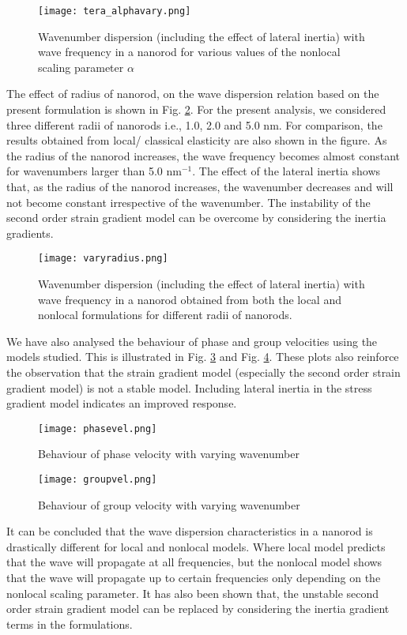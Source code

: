 \begin{figure}
\centering
\texttt{[image: tera\_alphavary.png]}
\caption{Wavenumber dispersion (including the effect of lateral inertia) with wave
frequency in a nanorod for various values of the nonlocal scaling parameter $\alpha$}
\label{varyalpha}
\end{figure}

The effect of radius of nanorod, on the wave dispersion relation
based on the present formulation is shown in Fig. \ref{varyradius}. For the present
analysis, we considered three different radii of nanorods i.e., 1.0,
2.0 and 5.0 nm. For comparison, the results obtained from local/
classical elasticity are also shown in the figure. As the radius of the
nanorod increases, the wave frequency becomes almost constant for
wavenumbers larger than 5.0 $\text{nm}^{-1}$. The effect of the lateral inertia
shows that, as the radius of the nanorod increases, the wavenumber
decreases and will not become constant irrespective of the wavenumber. The instability of the second order strain gradient
model can be overcome by considering the inertia gradients.

\begin{figure}
\centering
\texttt{[image: varyradius.png]}
\caption{Wavenumber dispersion (including the effect of lateral inertia) with wave
frequency in a nanorod obtained from both the local and nonlocal formulations for
different radii of nanorods.}
\label{varyradius}
\end{figure}

We have also analysed the behaviour of phase and group velocities using the models studied. This is illustrated in Fig. \ref{phasevel} and Fig. \ref{groupvel}. These plots also reinforce the observation that the strain gradient model (especially the second order strain gradient model) is not a stable model. Including lateral inertia in the stress gradient model indicates an improved response.

\begin{figure}
\centering
\texttt{[image: phasevel.png]}
\caption{Behaviour of phase velocity with varying wavenumber}
\label{phasevel}
\end{figure}

\begin{figure}
\centering
\texttt{[image: groupvel.png]}
\caption{Behaviour of group velocity with varying wavenumber}
\label{groupvel}
\end{figure}

It can be concluded that the wave dispersion characteristics in a
nanorod is drastically different for local and nonlocal models.
Where local model predicts that the wave will propagate at all
frequencies, but the nonlocal model shows that the wave will
propagate up to certain frequencies only depending on the nonlocal
scaling parameter. It has also been shown that, the unstable second
order strain gradient model can be replaced by considering the
inertia gradient terms in the formulations. 
